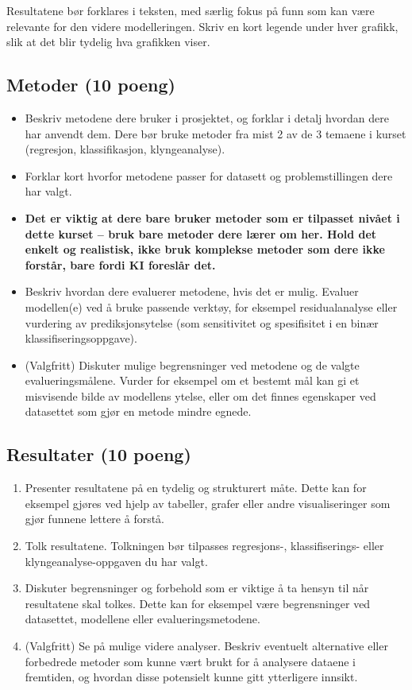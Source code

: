 \documentclass[]{article}
\begin{document}
Resultatene bør forklares i teksten, med særlig fokus på funn som kan
være relevante for den videre modelleringen. Skriv en kort legende under
hver grafikk, slik at det blir tydelig hva grafikken viser.

\subsection{Metoder (10 poeng)}\label{metoder-10-poeng}

\begin{itemize}
\item
  Beskriv metodene dere bruker i prosjektet, og forklar i detalj hvordan
  dere har anvendt dem. Dere bør bruke metoder fra mist 2 av de 3
  temaene i kurset (regresjon, klassifikasjon, klyngeanalyse).
\item
  Forklar kort hvorfor metodene passer for datasett og problemstillingen
  dere har valgt.
\item
  \textbf{Det er viktig at dere bare bruker metoder som er tilpasset
  nivået i dette kurset -- bruk bare metoder dere lærer om her. Hold det
  enkelt og realistisk, ikke bruk komplekse metoder som dere ikke
  forstår, bare fordi KI foreslår det.}
\item
  Beskriv hvordan dere evaluerer metodene, hvis det er mulig. Evaluer
  modellen(e) ved å bruke passende verktøy, for eksempel residualanalyse
  eller vurdering av prediksjonsytelse (som sensitivitet og spesifisitet
  i en binær klassifiseringsoppgave).
\item
  (Valgfritt) Diskuter mulige begrensninger ved metodene og de valgte
  evalueringsmålene. Vurder for eksempel om et bestemt mål kan gi et
  misvisende bilde av modellens ytelse, eller om det finnes egenskaper
  ved datasettet som gjør en metode mindre egnede.
\end{itemize}

\subsection{Resultater (10 poeng)}\label{resultater-10-poeng}

\begin{enumerate}
\def\labelenumi{\arabic{enumi}.}
\item
  Presenter resultatene på en tydelig og strukturert måte. Dette kan for
  eksempel gjøres ved hjelp av tabeller, grafer eller andre
  visualiseringer som gjør funnene lettere å forstå.
\item
  Tolk resultatene. Tolkningen bør tilpasses regresjons-,
  klassifiserings- eller klyngeanalyse-oppgaven du har valgt.
\item
  Diskuter begrensninger og forbehold som er viktige å ta hensyn til når
  resultatene skal tolkes. Dette kan for eksempel være begrensninger ved
  datasettet, modellene eller evalueringsmetodene.
\item
  (Valgfritt) Se på mulige videre analyser. Beskriv eventuelt
  alternative eller forbedrede metoder som kunne vært brukt for å
  analysere dataene i fremtiden, og hvordan disse potensielt kunne gitt
  ytterligere innsikt.
\end{enumerate}
\end{document}
